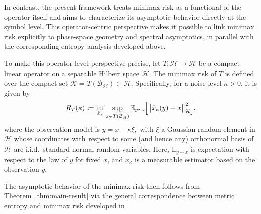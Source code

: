 \documentclass[a4paper,12pt]{article}
\let\originalleft\left
\let\originalright\right
\renewcommand{\left}{\mathopen{}\mathclose\bgroup\originalleft}
\renewcommand{\right}{\aftergroup\egroup\originalright}
\begin{document}
In contrast, the present framework treats minimax risk as a functional of the
operator itself and aims to characterize its asymptotic behavior directly at the
symbol level. This operator-centric perspective makes it possible to link minimax
risk explicitly to phase-space geometry and spectral asymptotics, in parallel with
the corresponding entropy analysis developed above. 

To make this operator-level perspective precise, let
$T\colon \mathcal{H}\to\mathcal{H}$ be a compact linear operator on a separable
Hilbert space $\mathcal{H}$. The minimax risk of $T$ is defined over the compact
set
\(
\mathcal{K}=\overline{T(\mathcal{B}_{\mathcal{H}})}\subset\mathcal{H}.
\)
Specifically, for a noise level $\kappa>0$, it is given by
\begin{equation*}
    R_T(\kappa)
    \coloneqq
    \inf_{\hat x_\kappa}
    \sup_{x\in \overline{T(\mathcal{B}_{\mathcal{H}})}}
    \mathbb{E}_{y\sim x}\!\left[
        \bigl\|\hat x_\kappa(y)-x\bigr\|_{\mathcal{H}}^{2}
    \right],
\end{equation*}
where the observation model is
\(
y = x + \kappa \xi,
\)
with $\xi$ a Gaussian random element in $\mathcal{H}$ whose coordinates with
respect to some (and hence any) orthonormal basis of $\mathcal{H}$ are i.i.d.\
standard normal random variables. Here, $\mathbb{E}_{y\sim x}$ is expectation with respect to the law of $y$ for fixed
$x$, and $\hat x_\kappa$ is a measurable estimator based on the observation $y$.

The asymptotic behavior of the minimax risk then follows from
Theorem~\ref{thm:main-result} via the general correspondence between metric entropy
and minimax risk developed in \cite{allard2025metricentropyminimaxrisk}.

\end{document}
